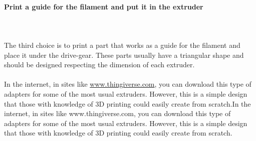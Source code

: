 \documentclass[11pt,a4paper]{article}
\begin{document}
			\paragraph{Print a guide for the filament and put it in the extruder}\mbox{}\\\\
The third choice is to print a part that works as a guide for the filament and place it under the drive-gear. These parts usually have a triangular shape and should be designed respecting the dimension of each extruder.
\\\\
In the internet, in sites like \url{www.thingiverse.com}, you can download this type of adapters for some of the most usual extruders. However, this is a simple design that those with knowledge of 3D printing could easily create from scratch.In the internet, in sites like www.thingiverse.com, you can download this type of adapters for some of the most usual extruders. However, this is a simple design that those with knowledge of 3D printing could easily create from scratch.
\end{document}

